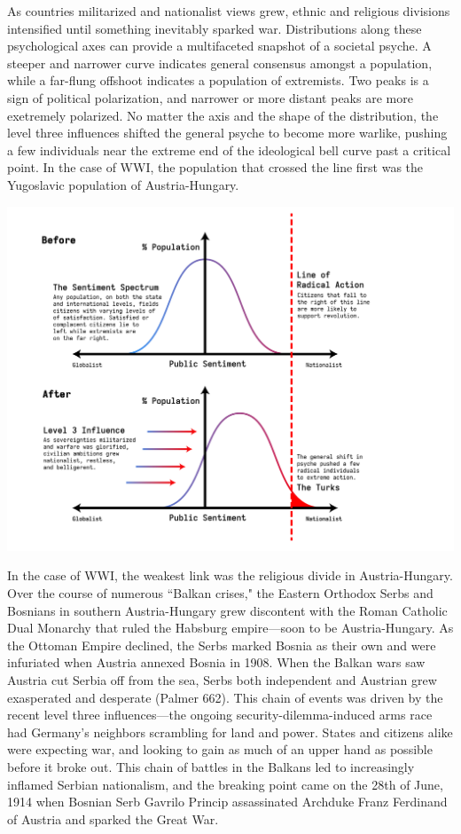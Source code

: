 \documentclass[letterpaper]{article}
\begin{document}
As countries militarized and nationalist views grew, ethnic and religious divisions intensified until something inevitably sparked war.
  Distributions along these psychological axes can provide a multifaceted snapshot of a societal psyche. A steeper and narrower curve indicates general consensus amongst a population, while a far-flung offshoot indicates a population of extremists. Two peaks is a sign of political polarization, and narrower or more distant peaks are more exetremely polarized.
No matter the axis and the shape of the distribution, the level three influences shifted the general psyche to become more warlike, pushing a few individuals near the extreme end of the ideological bell curve past a critical point. In the case of WWI, the population that crossed the line first was the Yugoslavic population of Austria-Hungary.

\begin{center}
\includegraphics[width=.9\linewidth]{KBe21hist201retCausesOfWWIEssayDiagram.png}
\end{center}

In the case of WWI, the weakest link was the religious divide in Austria-Hungary. Over the course of numerous ``Balkan crises," the Eastern Orthodox Serbs and Bosnians in southern Austria-Hungary grew discontent with the Roman Catholic Dual Monarchy that ruled the Habsburg empire—soon to be Austria-Hungary. As the Ottoman Empire declined, the Serbs marked Bosnia as their own and were infuriated when Austria annexed Bosnia in 1908. When the Balkan wars saw Austria cut Serbia off from the sea, Serbs both independent and Austrian grew exasperated and desperate (Palmer 662).
This chain of events was driven by the recent level three influences—the ongoing security-dilemma-induced arms race had Germany's neighbors scrambling for land and power. States and citizens alike were expecting war, and looking to gain as much of an upper hand as possible before it broke out.
This chain of battles in the Balkans led to increasingly inflamed Serbian nationalism, and the breaking point came on the 28th of June, 1914 when Bosnian Serb Gavrilo Princip assassinated Archduke Franz Ferdinand of Austria and sparked the Great War.
\end{document}
